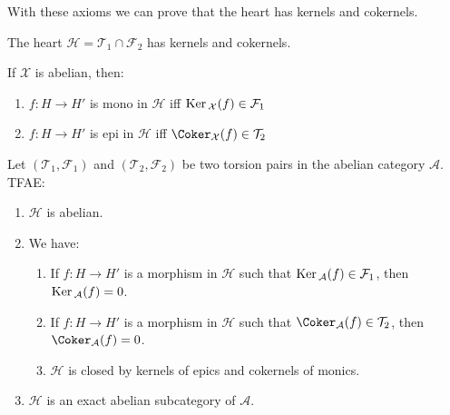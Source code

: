 With these axioms we can prove that the heart has kernels and cokernels.

\begin{lemma}\label{sec2:lem6}
  The heart $\mathcal{H}=\mathcal{T}_1\cap\mathcal{F}_2$ has kernels and cokernels.
\end{lemma}

\begin{rmk}
  If $\mathcal{X}$ is abelian, then:
  \begin{enumerate}
    \item $f:H\to H'$ is mono in $\mathcal{H}$ iff $\mathrm{\textup{Ker\,}}_\mathcal{X}(f)\in\mathcal{F}_1$
    \item $f:H\to H'$ is epi in $\mathcal{H}$ iff $\Coker_\mathcal{X}(f)\in\mathcal{T}_2$
  \end{enumerate}
\end{rmk}

\begin{prop}\label{sec2:prop1}
  Let $(\mathcal{T}_1,\mathcal{F}_1)$ and $(\mathcal{T}_2,\mathcal{F}_2)$ be two torsion pairs
  in the abelian category $\mathcal{A}$. TFAE:
  \begin{enumerate}
    \item $\mathcal{H}$ is abelian.
    \item We have:
    \begin{enumerate}
      \item If $f:H\to H'$ is a morphism in $\mathcal{H}$ such that
      $\mathrm{\textup{Ker\,}}_\mathcal{A}(f)\in\mathcal{F}_1$, then $\mathrm{\textup{Ker\,}}_\mathcal{A}(f)=0$.
      \item If $f:H\to H'$ is a morphism in $\mathcal{H}$ such that
      $\Coker_\mathcal{A}(f)\in\mathcal{T}_2$, then $\Coker_\mathcal{A}(f)=0$.
      \item $\mathcal{H}$ is closed by kernels of epics and cokernels of monics.
    \end{enumerate}
    \item $\mathcal{H}$ is an exact abelian subcategory of $\mathcal{A}$.
  \end{enumerate}
\end{prop}
